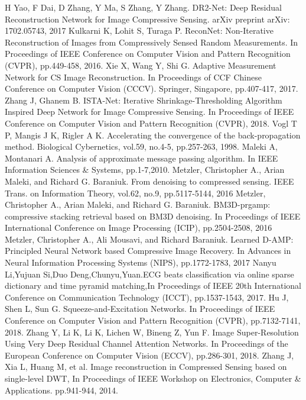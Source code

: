 \documentclass[conference]{IEEEtran}
\begin{document}
\begin{thebibliography}{1}
H Yao, F Dai, D Zhang, Y Ma, S Zhang, Y Zhang. DR2-Net: Deep Residual Reconstruction Network for Image Compressive Sensing. arXiv preprint arXiv: 1702.05743, 2017 
Kulkarni K, Lohit S, Turaga P. ReconNet: Non-Iterative Reconstruction of Images from Compressively Sensed Random Measurements. In Proceedings of IEEE Conference on Computer Vision and Pattern Recognition (CVPR), pp.449-458, 2016.
Xie X, Wang Y, Shi G. Adaptive Measurement Network for CS Image Reconstruction. In Proceedings of CCF Chinese Conference on Computer Vision (CCCV). Springer, Singapore, pp.407-417, 2017.
Zhang J, Ghanem B. ISTA-Net: Iterative Shrinkage-Thresholding Algorithm Inspired Deep Network for Image Compressive Sensing. In Proceedings of IEEE Conference on Computer Vision and Pattern Recognition (CVPR), 2018.
Vogl T P,  Mangis J K,  Rigler A K. Accelerating the convergence of the back-propagation method. Biological Cybernetics, vol.59, no.4-5, pp.257-263, 1998.
Maleki A, Montanari A. Analysis of approximate message passing algorithm. In IEEE Information Sciences \& Systems, pp.1-7,2010.
Metzler, Christopher A., Arian Maleki, and Richard G. Baraniuk. From denoising to compressed sensing. IEEE Trans. on Information Theory, vol.62, no.9, pp.5117-5144, 2016
Metzler, Christopher A., Arian Maleki, and Richard G. Baraniuk. BM3D-prgamp: compressive stacking retrieval based on BM3D denoising. In Proceedings of IEEE International Conference on Image Processing (ICIP), pp.2504-2508, 2016
Metzler, Christopher A., Ali Mousavi, and Richard Baraniuk. Learned D-AMP: Principled Neural Network based Compressive Image Recovery. In Advances in Neural Information Processing Systems (NIPS), pp.1772-1783, 2017
Nanyu Li,Yujuan Si,Duo Deng,Chunyu,Yuan.ECG beats classification via online sparse dictionary and time pyramid matching,In Proceedings of IEEE 20th International Conference on Communication Technology (ICCT), pp.1537-1543, 2017.
Hu J, Shen L, Sun G. Squeeze-and-Excitation Networks. In Proceedings of IEEE Conference on Computer Vision and Pattern Recognition (CVPR), pp.7132-7141, 2018.
Zhang Y, Li K, Li K, Lichen W, Bineng Z, Yun F. Image Super-Resolution Using Very Deep Residual Channel Attention Networks. In Proceedings of the European Conference on Computer Vision (ECCV), pp.286-301, 2018.
Zhang J, Xia L, Huang M, et al. Image reconstruction in Compressed Sensing based on single-level DWT, In Proceedings of IEEE Workshop on Electronics, Computer \& Applications. pp.941-944, 2014.

\end{thebibliography}
\end{document}
